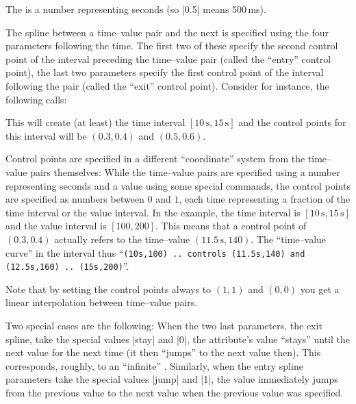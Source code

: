 \begin{command}{\pgfsysanimkeytime{}%
}
\end{command}
\begin{command}{\pgfsys@animation@time{}%
}
    The  is a number representing seconds (so |0.5| means 500\,ms).

    The spline between a time--value pair and the next is specified using the
    four parameters following the time. The first two of these specify the
    second control point of the interval preceding the time--value pair (called
    the ``entry'' control point), the last two parameters specify the first
    control point of the interval following the pair (called the ``exit''
    control point). Consider for instance, the following calls:
\begin{codeexample}
\end{codeexample}
    This will create (at least) the time interval $[10\,\mathrm s,15\,\mathrm
    s]$ and the control points for this interval will be $(0.3,0.4)$ and
    $(0.5,0.6)$.

    Control points are specified in a different ``coordinate'' system from the
    time--value pairs themselves: While the time--value pairs are specified
    using a number representing seconds and a value using some special
    commands, the control points are specified as numbers between $0$ and $1$,
    each time representing a fraction of the time interval or the value
    interval. In the example, the time interval is $[10\,\mathrm s,15\,\mathrm
    s]$ and the value interval is $[100,200]$. This means that a control point
    of $(0.3,0.4)$ actually refers to the time--value $(11.5\,\mathrm s,140)$.
    The ``time--value curve'' in the interval thus ``\texttt{(10s,100) ..
    controls (11.5s,140) and (12.5s,160) .. (15s,200)}''.

    Note that by setting the control points always to $(1,1)$ and $(0,0)$ you
    get a linear interpolation between time--value pairs.

    Two special cases are the following: When the two last parameters, the exit
    spline, take the special values |stay| and |0|, the attribute's value
    ``stays'' until the next value for the next time (it then ``jumps'' to the
    next value then). This corresponds, roughly, to an ``infinite'' . Similarly, when the entry spline parameters take the
    special values |jump| and |1|, the value immediately jumps from the
    previous value to the next value when the previous value was specified.
\end{command}

